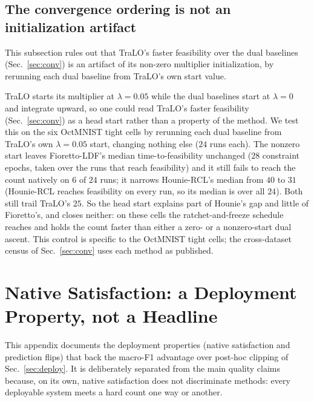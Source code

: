 \documentclass[10pt]{article}
\begin{document}
\subsection{The convergence ordering is not an initialization artifact}
\label{app:init}

This subsection rules out that TraLO's faster feasibility over the dual
baselines (Sec.~\ref{sec:conv}) is an artifact of its non-zero multiplier
initialization, by rerunning each dual baseline from TraLO's own start
value.

TraLO starts its multiplier at $\lambda{=}0.05$ while the dual
baselines start at $\lambda{=}0$ and integrate upward, so one could
read TraLO's faster feasibility (Sec.~\ref{sec:conv}) as a head start
rather than a property of the method. We test this on the six OctMNIST
tight cells by rerunning each dual baseline from TraLO's own
$\lambda{=}0.05$ start, changing nothing else ($24$ runs each). The
nonzero start leaves Fioretto-LDF's median time-to-feasibility
unchanged ($28$ constraint epochs, taken over the runs that reach
feasibility) and it still fails to reach the count natively on $6$ of
$24$ runs; it narrows Hounie-RCL's median from $40$ to $31$
(Hounie-RCL reaches feasibility on every run, so its median is over
all $24$). Both still trail TraLO's $25$. So the head start explains
part of Hounie's gap and little of Fioretto's, and closes neither: on
these cells the ratchet-and-freeze schedule reaches and holds the
count faster than either a zero- or a nonzero-start dual ascent. This
control is specific to the OctMNIST tight cells; the cross-dataset
census of Sec.~\ref{sec:conv} uses each method as published.



\section{Native Satisfaction: a Deployment Property, not a Headline}
\label{app:deploy}

This appendix documents the deployment properties (native satisfaction
and prediction flips) that back the macro-F1 advantage over post-hoc
clipping of Sec.~\ref{sec:deploy}. It is deliberately separated from the
main quality claims because, on its own, native satisfaction does not
discriminate methods: every deployable system meets a hard count one
way or another.


\end{document}
